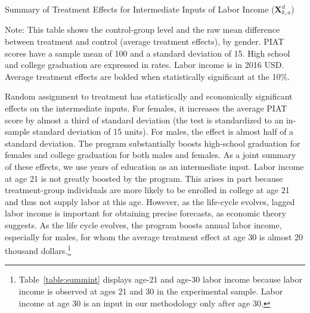 \begin{table}[!htpb]
\begin{threeparttable}
\caption{Summary of Treatment Effects for Intermediate Inputs of Labor Income ($\bm{X}^d_{k,a}$)} \label{table:summint}
\centering

\begin{tablenotes}
\footnotesize
\item Note: This table shows the control-group level and the raw mean difference between treatment and control (average treatment effects), by gender. PIAT scores have a sample mean of 100 and a standard deviation of 15. High school and college graduation are expressed in rates. Labor income is in 2016 USD. Average treatment effects are bolded when statistically significant at the 10\%.
\end{tablenotes}
\end{threeparttable}
\end{table}

Random assignment to treatment has statistically and economically significant effects on the intermediate inputs. For females, it increases the average PIAT score by almost a third of standard deviation (the test is standardized to an in-sample standard deviation of 15 units). For males, the effect is almost half of a standard deviation. The program substantially boosts high-school graduation for females and college graduation for both males and females. As a joint summary of these effects, we use years of education as an intermediate input. Labor income at age 21 is not greatly boosted by the program. This arises in part because treatment-group individuals are more likely to be enrolled in college at age 21 and thus not supply labor at this age. However, as the life-cycle evolves, lagged labor income is important for obtaining precise forecasts, as economic theory suggests. As the life cycle evolves, the program boosts annual labor income, especially for males, for whom the average treatment effect at age 30 is almost 20 thousand dollars.\footnote{Table~\ref{table:summint} displays age-21 and age-30 labor income because labor income is observed at ages 21 and 30 in the experimental sample. Labor income at age 30 is an input in our methodology only after age 30.}\\

